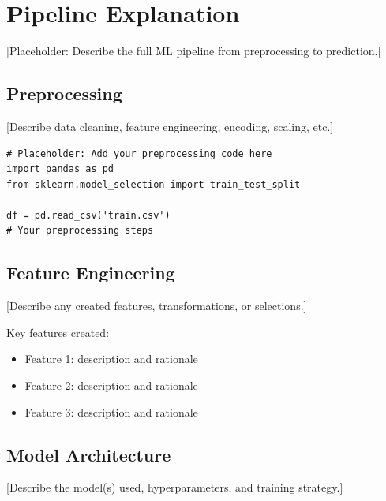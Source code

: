 \documentclass{article}
\begin{document}

\section{Pipeline Explanation}

 [Placeholder: Describe the full ML pipeline from preprocessing to prediction.]

\subsection{Preprocessing}

[Describe data cleaning, feature engineering, encoding, scaling, etc.]

\begin{lstlisting}[caption=Preprocessing snippet]
# Placeholder: Add your preprocessing code here
import pandas as pd
from sklearn.model_selection import train_test_split

df = pd.read_csv('train.csv')
# Your preprocessing steps
\end{lstlisting}

\subsection{Feature Engineering}

[Describe any created features, transformations, or selections.]

Key features created:
\begin{itemize}
    \item Feature 1: description and rationale
    \item Feature 2: description and rationale
    \item Feature 3: description and rationale
\end{itemize}

\subsection{Model Architecture}

[Describe the model(s) used, hyperparameters, and training strategy.]
\end{document}
